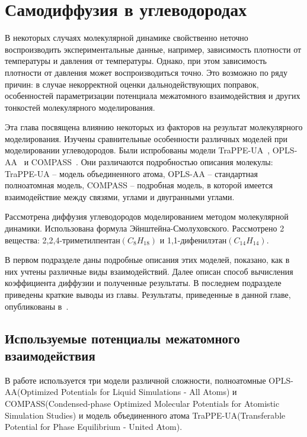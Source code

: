 \chapter{Самодиффузия в углеводородах}\label{ch:ch2}

В некоторых случаях молекулярной динамике свойственно неточно воспроизводить экспериментальные данные, например, зависимость плотности от температуры и давления от температуры. Однако, при этом зависимость плотности от давления может воспроизводиться точно. Это возможно по ряду причин: в случае некорректной оценки дальнодействующих поправок, особенностей параметризации потенциала межатомного взаимодействия и других тонкостей молекулярного моделирования.

Эта глава посвящена влиянию некоторых из факторов на результат молекулярного моделирования. Изучены сравнительные особенности различных моделей при моделировании углеводородов. Были испробованы модели TraPPE-UA~\cite{trappeua}, OPLS-AA~\cite{jorgensen_development_1996} и COMPASS~\cite{sun_compass_1998}. Они различаются подробностью описания молекулы: TraPPE-UA \--- модель объединенного атома, OPLS-AA \--- стандартная полноатомная модель, COMPASS \--- подробная модель, в которой имеется взаимодействие между связями, углами и двугранными углами.

Рассмотрена диффузия углеводородов моделированием методом молекулярной динамики. Использована формула Эйнштейна-Смолуховского. Рассмотрено 2 вещества: 2,2,4-триметилпентан$(C_8H_{18})$ и 1,1-дифенилэтан$(C_{14}H_{14})$. 

В первом подразделе даны подробные описания этих моделей, показано, как в них учтены различные виды взаимодействий. Далее описан способ вычисления коэффициента диффузии и полученные результаты. В последнем подразделе приведены краткие выводы из главы. Результаты, приведенные в данной главе, опубликованы в~\cite{kondratyuk_transport_2020}.

\section{Используемые потенциалы межатомного взаимодействия}

В работе используется три модели различной сложности, полноатомные OPLS-AA(Optimized Potentials for Liquid Simulations \-- All Atoms) и COMPASS(Condensed-phase Optimized Molecular Potentials for Atomistic Simulation Studies) и модель объединенного атома TraPPE-UA(Transferable Potential for Phase Equilibrium \-- United Atom). 

